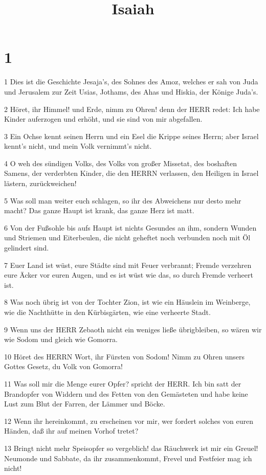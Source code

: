 

\title{Isaiah}


\chapter{1}

\par 1 Dies ist die Geschichte Jesaja's, des Sohnes des Amoz, welches er sah von Juda und Jerusalem zur Zeit Usias, Jothams, des Ahas und Hiskia, der Könige Juda's.
\par 2 Höret, ihr Himmel! und Erde, nimm zu Ohren! denn der HERR redet: Ich habe Kinder auferzogen und erhöht, und sie sind von mir abgefallen.
\par 3 Ein Ochse kennt seinen Herrn und ein Esel die Krippe seines Herrn; aber Israel kennt's nicht, und mein Volk vernimmt's nicht.
\par 4 O weh des sündigen Volks, des Volks von großer Missetat, des boshaften Samens, der verderbten Kinder, die den HERRN verlassen, den Heiligen in Israel lästern, zurückweichen!
\par 5 Was soll man weiter euch schlagen, so ihr des Abweichens nur desto mehr macht? Das ganze Haupt ist krank, das ganze Herz ist matt.
\par 6 Von der Fußsohle bis aufs Haupt ist nichts Gesundes an ihm, sondern Wunden und Striemen und Eiterbeulen, die nicht geheftet noch verbunden noch mit Öl gelindert sind.
\par 7 Euer Land ist wüst, eure Städte sind mit Feuer verbrannt; Fremde verzehren eure Äcker vor euren Augen, und es ist wüst wie das, so durch Fremde verheert ist.
\par 8 Was noch übrig ist von der Tochter Zion, ist wie ein Häuslein im Weinberge, wie die Nachthütte in den Kürbisgärten, wie eine verheerte Stadt.
\par 9 Wenn uns der HERR Zebaoth nicht ein weniges ließe übrigbleiben, so wären wir wie Sodom und gleich wie Gomorra.
\par 10 Höret des HERRN Wort, ihr Fürsten von Sodom! Nimm zu Ohren unsers Gottes Gesetz, du Volk von Gomorra!
\par 11 Was soll mir die Menge eurer Opfer? spricht der HERR. Ich bin satt der Brandopfer von Widdern und des Fetten von den Gemästeten und habe keine Lust zum Blut der Farren, der Lämmer und Böcke.
\par 12 Wenn ihr hereinkommt, zu erscheinen vor mir, wer fordert solches von euren Händen, daß ihr auf meinen Vorhof tretet?
\par 13 Bringt nicht mehr Speisopfer so vergeblich! das Räuchwerk ist mir ein Greuel! Neumonde und Sabbate, da ihr zusammenkommt, Frevel und Festfeier mag ich nicht!
